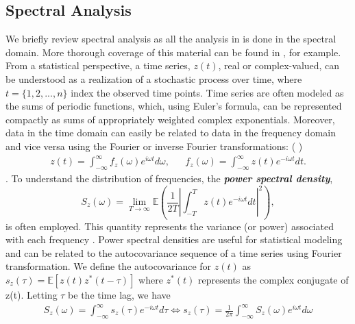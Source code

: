 \documentclass{stat572Style}
\newcommand{\hdcomment}[1]{({\color{red}{HD's comment:}} \textbf{\color{red}{#1}})}
\begin{document}
	\subsection{Spectral Analysis}
	\label{sec: specAnalysis}
	\indent We briefly review spectral analysis as all the analysis in \citet{Sykulski2016} is done in the spectral domain.   
	More thorough coverage of this material can be found in  \citep{Percival1993}, for example. 
	From a statistical perspective, a time series, $z(t)$, real or complex-valued,  can be understood as a realization of a stochastic process over time, where  $t = \{1,2,...,n\}$ index the observed time points.  
	Time series are often modeled as the sums of periodic functions, which, using Euler's formula, can be represented compactly as sums of appropriately weighted complex exponentials. 
	Moreover, data in the time domain can easily be related to data in the frequency domain and vice versa using the Fourier or inverse Fourier transformations:
	\hdcomment{these are wrong} 	
	\begin{align}
z(t) = \int_{-\infty}^{\infty} f_{z}(\omega)e^{i\omega t}d\omega,&& f_{z}(\omega) = \int_{-\infty}^{\infty} z(t) e^{-i \omega t }dt.
\end{align}
\citep{Percival1993}. 
To understand the distribution of frequencies, the \textbf{\it{power spectral density}},
\begin{equation}
S_{z}(\omega) = \underset{T \rightarrow \infty}{\lim} \mathbb{E} \left(\frac{1}{2T} \left| \int_{-T}^{T} z(t) e^{-i \omega t}dt \right|^{2} \right),
\end{equation}
is often employed. 
This quantity represents the variance (or power) associated with each frequency \citep{Percival1993}. 
Power spectral densities are useful for statistical modeling and can be related to the autocovariance sequence of a time series using  Fourier transformation.  
We define the autocovariance  for $z(t)$ as $s_{z}(\tau) = \mathbb{E}[z(t) z^{*}(t - \tau)] $ where $z^{*}(t)$ represents the complex conjugate of z(t). Letting $\tau$ be the time lag, we have
\begin{align}
\label{eq: fourierPair}
S_{z}(\omega) = \int_{-\infty}^{\infty}s_{z}(\tau) e^{-i\omega t}d \tau \Longleftrightarrow s_{z}(\tau) = \frac{1}{2\pi} \int_{-\infty}^{\infty}S_{z}(\omega) e^{i \omega t} d\omega 
\end{align}
\end{document}
